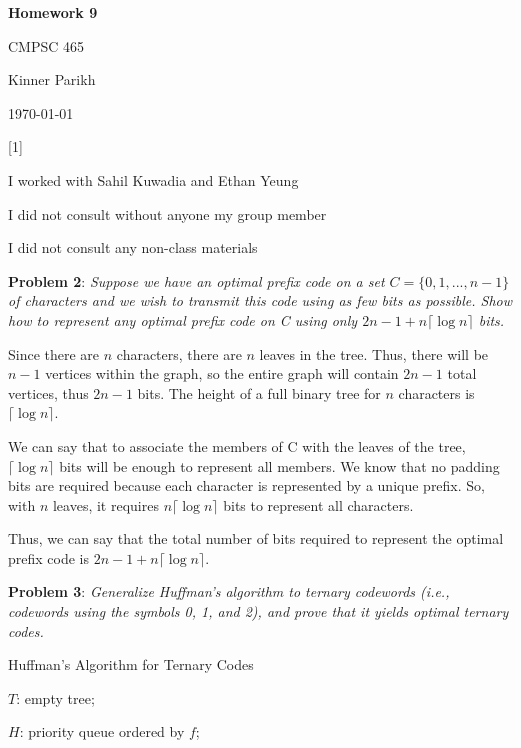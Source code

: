 \documentclass{article} %
\newcommand{\question}[2][]{\begin{flushleft}
        \textbf{Problem #1}: \textit{#2}

\end{flushleft}}
\newcommand{\maketitletwo}[2][]{\begin{center}
        \Large{\textbf{Homework #1}
            
            CMPSC 465} %
        \vspace{5pt}
        
        \normalsize{Kinner Parikh  %
        
        \today}        %
        \vspace{40pt}


        \newpage
        
\end{center}}
\begin{document}
    \maketitletwo[9]  %

    \question[1]{}
    \begin{center}
        
        I worked with Sahil Kuwadia and Ethan Yeung
    
        I did not consult without anyone my group member
    
        I did not consult any non-class materials
    \end{center}
    
    \newpage

    \question[2]{Suppose we have an optimal prefix code on a set $C = \{0,1,...,n-1\}$ of characters and we wish to transmit this code using as few bits as possible. Show how to represent any optimal prefix code on C using only $2n-1 + n\lceil \log n \rceil$ bits.}

    Since there are $n$ characters, there are $n$ leaves in the tree. Thus, there will be $n-1$ vertices within the graph, so the entire graph will contain $2n-1$ total vertices, thus $2n-1$ bits. The height of a full binary tree for $n$ characters is $\lceil \log n \rceil$. 

    We can say that to associate the members of C with the leaves of the tree, $\lceil \log n \rceil$ bits will be enough to represent all members. We know that no padding bits are required because each character is represented by a unique prefix. So, with $n$ leaves, it requires $n \lceil \log n \rceil$ bits to represent all characters.
    
    Thus, we can say that the total number of bits required to represent the optimal prefix code is $2n-1 + n\lceil \log n \rceil$.

    \newpage

    \question[3]{Generalize Huffman's algorithm to ternary codewords (i.e., codewords using the symbols 0, 1, and 2), and prove that it yields optimal ternary codes.}

    \begin{algorithm}
        \caption{Huffman's Algorithm for Ternary Codes}

        $T$: empty tree;
        
        $H$: priority queue ordered by $f$;
        


    \end{algorithm}
\end{document}
